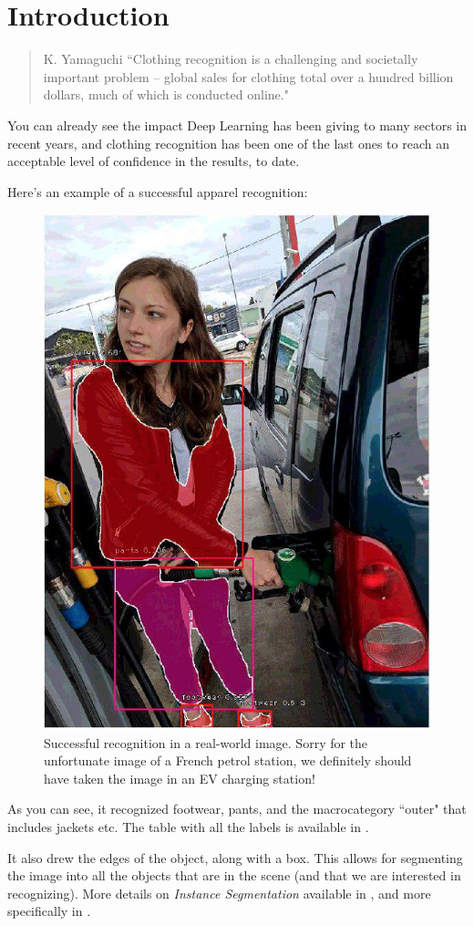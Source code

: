 \chapter*{Introduction}


\begin{quote}{K. Yamaguchi}
	“Clothing recognition is a challenging and societally important problem – global sales for clothing total over a hundred billion dollars, much of which is conducted online." \cite{yamaguchi2013paper}
\end{quote}

You can already see the impact Deep Learning has been giving to many sectors in recent years, and clothing recognition has been one of the last ones to reach an acceptable level of confidence in the results, to date.

Here's an example of a successful apparel recognition:

\begin{figure}[H]
	\centering
	\includegraphics[width=.5\linewidth]{images/difficultscenario.jpg}
	\caption{Successful recognition in a real-world image. Sorry for the unfortunate image of a French petrol station, we definitely should have taken the image in an EV charging station!}
\end{figure}

As you can see, it recognized footwear, pants, and the macrocategory “outer" that includes jackets etc. The table with all the labels is available in .

It also drew the edges of the object, along with a box. This allows for segmenting the image into all the objects that are in the scene (and that we are interested in recognizing).
More details on \emph{Instance Segmentation} available in , and more specifically in .

